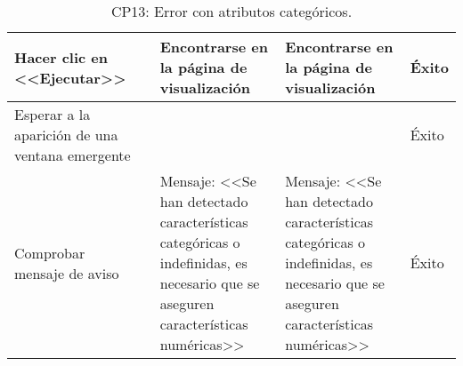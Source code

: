 \begin{table}[H]
\begin{tabular}{p{}p{}p{}p{}p{}}
Hacer clic en <<Ejecutar>>                            &                        & Encontrarse en la página de visualización                            & Encontrarse en la página de visualización                    & Éxito                            \\ \hline
Esperar a la aparición de una ventana emergente       &                   & & & Éxito  \\ \hline 
Comprobar mensaje de aviso                            &                        & Mensaje: <<Se han detectado características categóricas o indefinidas, es necesario que se aseguren características numéricas>> & Mensaje: <<Se han detectado características categóricas o indefinidas, es necesario que se aseguren características numéricas>> & Éxito \\ \hline
\end{tabular}
\caption{CP13: Error con atributos categóricos.}
\end{table}

